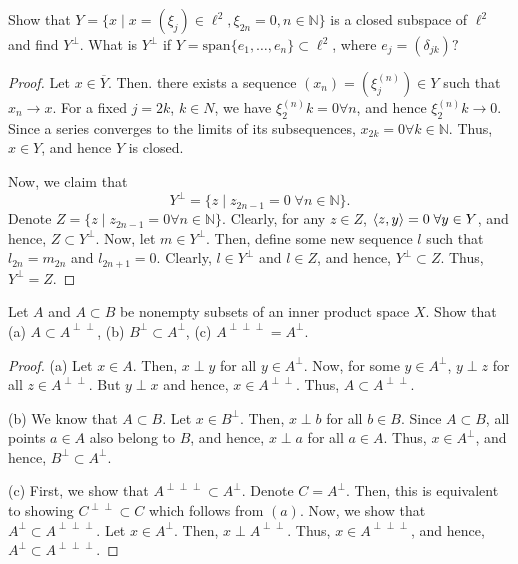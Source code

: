 \begin{question}
    Show that $Y = \{x \mid x = (\xi_j) \in \ell^2 , \xi_{2n} = 0 , n \in \mathbb{N}\}$ is a closed subspace of $\ell^2$ and find $Y^\perp$. What is $Y^\perp$ if $Y = \textrm{span}\{e_1 , \ldots , e_n\} \subset \ell^2$, where $e_j = (\delta_{jk})?$
    \label{section3.3-6}
\end{question}
\begin{proof}
    Let $x \in \overline{Y}$. Then. there exists a sequence $(x_n) = (\xi^{(n)}_j) \in Y$ such that $x_n \rightarrow x$. For a fixed $j = 2k$, $k \in N$, we have $\xi^{(n)}_2k = 0 \forall n$, and hence $\xi^{(n)}_2k \rightarrow 0$. Since a series converges to the limits of its subsequences, $x_{2k} = 0 \forall k \in \mathbb{N}$. Thus, $x \in Y$, and hence $Y$ is closed. 

    Now, we claim that 
    \[Y^\perp = \{z \mid z_{2n-1} = 0 \;\forall n \in \mathbb{N}\}.\]
    Denote $Z =  \{z \mid z_{2n-1} = 0 \forall n \in \mathbb{N}\}$. Clearly, for any $z \in Z$, $\left\langle z , y \right\rangle = 0 \;\forall y \in Y$, and hence, $Z \subset Y^\perp$. Now, let $m \in Y^\perp$. Then, define some new sequence $l$ such that $l_{2n} = m_{2n}$ and $l_{2n+1} = 0$. Clearly, $l \in Y^\perp$ and $l \in Z$, and hence, $Y^\perp \subset Z$. Thus, $Y^\perp = Z$.
    
\end{proof}

\begin{question}
    Let $A$ and $A \subset B$ be nonempty subsets of an inner product space $X$. Show that (a) $A \subset A^{\perp\perp}$, (b) $B^\perp \subset A^\perp$, (c) $A^{\perp\perp\perp} = A^\perp$.
    \label{section3.3-7}
\end{question}
\begin{proof}
    (a) Let $x \in A$. Then, $x \perp y$ for all $y \in A^\perp.$ Now, for some $y \in A^\perp$, $y \perp z$ for all $z \in A^{\perp\perp}$. But $y \perp x$ and hence, $x \in A^{\perp\perp}$. Thus, $A \subset A^{\perp\perp}$.

    (b) We know that $A \subset B$. Let $x \in B^\perp$. Then, $x \perp b$ for all $b \in B$. Since $A \subset B$, all points $a \in A$ also belong to $B$, and hence, $x \perp a$ for all $a \in A$. Thus, $x \in A^\perp$, and hence, $B^\perp \subset A^\perp.$

    (c) First, we show that $A^{\perp\perp\perp} \subset A^\perp$. Denote $C = A^\perp$. Then, this is equivalent to showing $C^{\perp\perp} \subset C$ which follows from $(a)$. Now, we show that $A^\perp \subset A^{\perp\perp\perp}.$ Let $x \in A^\perp$. Then, $x \perp A^{\perp\perp}$. Thus, $x \in A^{\perp\perp\perp}$, and hence, $A^\perp \subset A^{\perp\perp\perp}$.

\end{proof}

